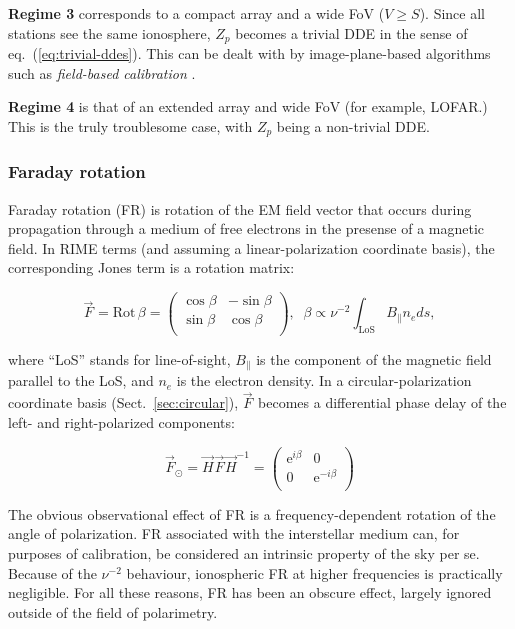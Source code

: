 \documentclass[]{aa}
\newcommand{\matrixtt}[4]{\left( \begin{array}{cc}#1&#2\\#3&#4\\\end{array} \right)}
\newcommand{\jones}[2]{\vec {#1}_{#2}}
\newcommand{\jonesinv}[2]{\vec {#1}^{-1}_{#2}}
\begin{document}
{\bf Regime 3} corresponds to a compact array and a wide FoV ($V\ge S$). Since all stations see the same ionosphere, $Z_p$ becomes a trivial DDE in the sense of eq.~(\ref{eq:trivial-ddes}). This can be dealt with by image-plane-based algorithms such as \emph{field-based calibration} \citep{Cotton:FBC}.

{\bf Regime 4} is that of an extended array and wide FoV (for example, LOFAR.) This is the truly troublesome case, with $Z_p$ being a non-trivial DDE.

\subsubsection{Faraday rotation\label{sec:DFR}\label{sec:FR}}

Faraday rotation (FR) is rotation of the EM field vector that occurs during propagation through a medium of free electrons in the presense of a magnetic field. In RIME terms (and assuming a linear-polarization coordinate basis), the corresponding Jones term is a rotation matrix:

\begin{equation}\label{eq:FR}
\jones{F}{} = \mathrm{Rot}\,\beta = \matrixtt{\cos\beta}{-\sin\beta}{\sin\beta}{\cos\beta}, \;\;
\beta \propto \nu^{-2} \int_\mathrm{LoS} B_{\parallel} n_e ds,
\end{equation}

where ``LoS'' stands for line-of-sight, $B_{\parallel}$ is the component of the magnetic field parallel to the LoS, and $n_e$ is the electron density. In a circular-polarization coordinate basis (Sect.~\ref{sec:circular}), $\jones{F}{}$ becomes a differential phase delay of the left- and right-polarized components:

\[
\jones{F}{\odot} = \jones{H}{}\jones{F}{}\jonesinv{H}{} = \matrixtt{\mathrm{e}^{i\beta}}{0}{0}{\mathrm{e}^{-i\beta}}
\]

The obvious observational effect of FR is a frequency-dependent rotation of the angle of polarization. FR associated with the interstellar medium can, for purposes of calibration, be considered an intrinsic property of the sky per se. Because of the $\nu^{-2}$ behaviour, ionospheric FR at higher frequencies is practically negligible. For all these reasons, FR has been an obscure effect, largely ignored outside of the field of polarimetry.
\end{document}

